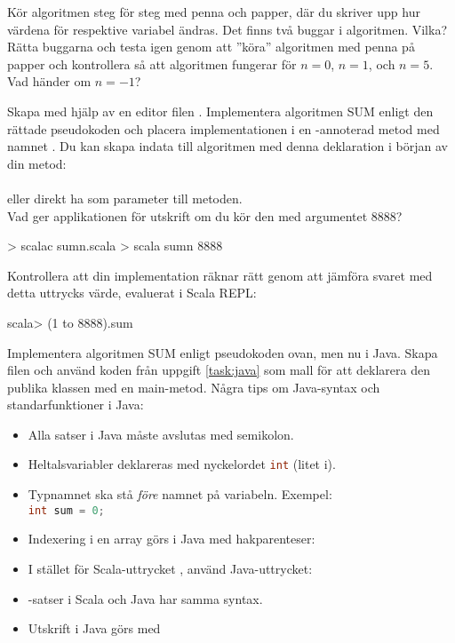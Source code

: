 \Subtask Kör algoritmen steg för steg med penna och papper, där du skriver upp hur värdena för respektive variabel ändras. Det finns två buggar i algoritmen. Vilka? Rätta buggarna och testa igen genom att ''köra'' algoritmen med penna på papper och kontrollera så att algoritmen fungerar för $n=0$, $n=1$, och $n=5$. Vad händer om $n=-1$?

\Subtask Skapa med hjälp av en editor filen . Implementera algoritmen SUM enligt den rättade pseudokoden och placera implementationen i en -annoterad metod med namnet . Du kan skapa indata  till algoritmen med denna deklaration i början av din metod: \\  \\eller direkt ha  som parameter till metoden. \\ Vad ger applikationen för utskrift om du kör den med argumentet 8888?

\begin{REPLnonum}
> scalac sumn.scala
> scala sumn 8888
\end{REPLnonum}

\noindent Kontrollera att din implementation räknar rätt genom att jämföra svaret med detta uttrycks värde, evaluerat i Scala REPL:
\begin{REPLnonum}
scala> (1 to 8888).sum
\end{REPLnonum}


\Subtask {}

Implementera algoritmen SUM enligt pseudokoden ovan, men nu i Java. Skapa filen  och använd koden från uppgift \ref{task:java} som mall för att deklarera den publika klassen  med en main-metod. Några tips om Java-syntax och standarfunktioner i Java:

\begin{itemize}%
\item Alla satser i Java måste avslutas med semikolon.
\item Heltalsvariabler deklareras med nyckelordet \lstinline[language=Java]{int} (litet i).
\item Typnamnet ska stå \emph{före} namnet på variabeln. Exempel: \\ \lstinline[language=Java]{int sum = 0;}
\item Indexering i en array görs i Java med hakparenteser: 
\item I stället för Scala-uttrycket , använd Java-uttrycket: \\ 
\item {}-satser i Scala och Java har samma syntax.
\item Utskrift i Java görs med 
\end{itemize}


